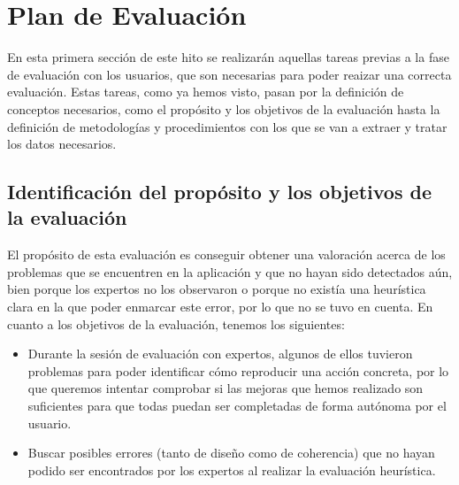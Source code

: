 \section{Plan de Evaluación}
En esta primera sección de este hito se realizarán aquellas tareas previas a la fase de evaluación con los usuarios, que son necesarias para poder reaizar una correcta
evaluación. Estas tareas, como ya hemos visto, pasan por la definición de conceptos necesarios, como el propósito y los objetivos de la evaluación hasta la definición de 
metodologías y procedimientos con los que se van a extraer y tratar los datos necesarios.

\subsection{Identificación del propósito y los objetivos de la evaluación}
El propósito de esta evaluación es conseguir obtener una valoración acerca de los problemas que se encuentren en la aplicación y que no hayan sido detectados aún, 
bien porque los expertos no los observaron o porque no existía una heurística clara en la que poder enmarcar este error, por lo que no se tuvo en cuenta. En cuanto
a los objetivos de la evaluación, tenemos los siguientes:
\begin{itemize}
    \item Durante la sesión de evaluación con expertos, algunos de ellos tuvieron problemas para poder identificar cómo reproducir una acción concreta, por lo que 
    queremos intentar comprobar si las mejoras que hemos realizado son suficientes para que todas puedan ser completadas de forma autónoma por el usuario.
    \item Buscar posibles errores (tanto de diseño como de coherencia) que no hayan podido ser encontrados por los expertos al realizar la evaluación heurística.
\end{itemize}

